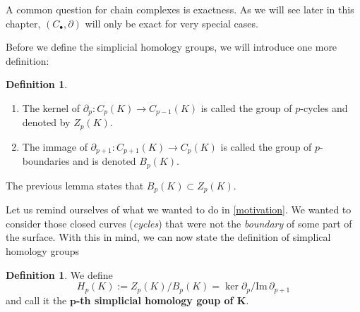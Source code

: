 \documentclass[draft,toc=bib]{scrartcl}
\theoremstyle{plain}
\theoremstyle{definition}
\newtheorem	{definition}[theorem]{Definition}
\theoremstyle{remark}
\newcommand{\im}{\mathrm{Im}\,}
\begin{document}
A common question for chain complexes is exactness. As we will see later in this chapter, $(C_\bullet,\partial)$ will only be exact for very special cases. 

Before we define the simplicial homology groups, we will introduce one more definition:

\begin{definition}\mbox{}
	\begin{enumerate}
		\item The kernel of $\partial_p: C_p(K)\to C_{p-1}(K)$ is called the group of $p$-cycles and denoted by $Z_p(K)$.
		\item The immage of $\partial_{p+1}: C_{p+1}(K)\to C_{p}(K)$ is called the group of $p$-boundaries and is denoted $B_p(K)$.
	\end{enumerate}
	
\end{definition}
The previous lemma states that $B_p(K)\subset Z_p(K)$.

Let us remind ourselves of what we wanted to do in \autoref{motivation}. We wanted to consider those closed curves (\emph{cycles}) that were not the \emph{boundary} of some part of the surface. With this in mind, we can now state the definition of simplical homology groups

\begin{definition}
	We define \[
	H_p(K):=Z_p(K)/B_p(K)=\ker \partial_p/\im \partial_{p+1}
	\]
	and call it the \textbf{$\mathbf{p}$-th simplicial homology goup of $\mathbf{K}$}.
\end{definition}
\end{document}

